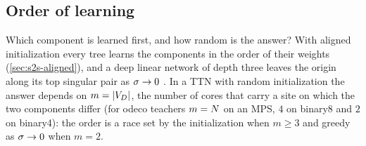 \subsection{Order of learning}\label{sec:s2s-order}

Which component is learned first, and how random is the answer? With aligned initialization every tree learns the
components in the order of their weights (\cref{sec:s2s-aligned}), and a deep linear network of depth three leaves
the origin along its top singular pair as $\sigma\to0$ . In a TTN with random initialization the answer
depends on $m=\lvert V_D\rvert$, the number of cores that carry a site on which the two components differ (for odeco
teachers $m=N$ on an MPS, $4$ on binary8 and $2$ on binary4): the order is a race set by the initialization when
$m\ge3$ and greedy as $\sigma\to0$ when $m=2$.

